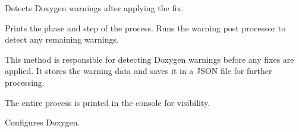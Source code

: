 \documentclass[letterpaper,10pt,english]{sphinxmanual}
\begin{document}
\begin{fulllineitems}
\begin{description}
\end{description}

\begin{fulllineitems}
\label{\detokenize{main.ai_doxygen_cleaner:main.ai_doxygen_cleaner.ai_doxygen_cleaner.AIDoxygenCleaner.detect_warnings_post_fix}}
\pysigstartsignatures
{}
\pysigstopsignatures
\sphinxAtStartPar
Detects Doxygen warnings after applying the fix.

\sphinxAtStartPar
Prints the phase and step of the process.
Runs the warning post processor to detect any remaining warnings.

\end{fulllineitems}


\begin{fulllineitems}
\label{\detokenize{main.ai_doxygen_cleaner:main.ai_doxygen_cleaner.ai_doxygen_cleaner.AIDoxygenCleaner.detect_warnings_pre_fix}}
\pysigstartsignatures
{}
\pysigstopsignatures
\sphinxAtStartPar
This method is responsible for detecting Doxygen warnings before any fixes are applied.
It stores the warning data and saves it in a JSON file for further processing.

\sphinxAtStartPar
The entire process is printed in the console for visibility.

\end{fulllineitems}


\begin{fulllineitems}
\label{\detokenize{main.ai_doxygen_cleaner:main.ai_doxygen_cleaner.ai_doxygen_cleaner.AIDoxygenCleaner.doxygen_configuration}}
\pysigstartsignatures
{}
\pysigstopsignatures
\sphinxAtStartPar
Configures Doxygen.


\end{fulllineitems}
\end{fulllineitems}
\end{document}
